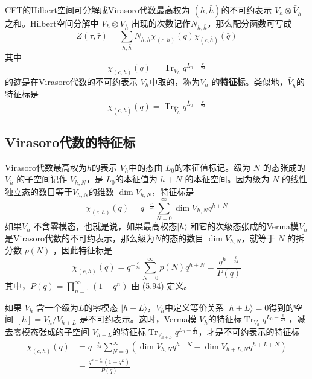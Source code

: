 CFT的Hilbert空间可分解成Virasoro代数最高权为 $(h, \bar{h}) $的不可约表示 $V_{h} \otimes \bar{V}_{\bar{h}} $之和。Hilbert空间分解中 $V_{h} \otimes \bar{V}_{\bar{h}}$ 出现的次数记作$ N_{h, \bar{h}} $，那么配分函数可写成
\begin{equation}
	Z(\tau, \bar{\tau})=\sum_{h, \bar{h}} N_{h, \bar{h}} \chi_{(c, h)}(q) \chi_{(c, \bar{h})}(\bar{q})
\end{equation} 
其中
\begin{equation}
	\chi_{(c, h)}(q)=\operatorname{Tr}_{V_{h}} q^{L_{0}-\frac{c}{24}} 
\end{equation}
的迹是在Virasoro代数的不可约表示 $V_h $中取的，称为$ V_h$ 的\textbf{特征标}。类似地，$ \bar{V}_{\bar{h}} $的特征标是
\begin{equation}
	\chi_{(c, \bar{h})}(\bar{q})=\operatorname{Tr}_{\bar{V}_{\bar{h}}} \bar{q}^{\bar{L}_{0}-\frac{c}{24}} 
\end{equation}

\subsection{Virasoro代数的特征标}

Virasoro代数最高权为$ h $的表示 $V_h $中的态由 $L_0 $的本征值标记。级为 $N$ 的态张成的 $V_h$ 的子空间记作 $V_{h, N} $，是 $L_0 $的本征值为 $h+N$ 的本征空间。因为级为 $N$ 的线性独立态的数目等于$ V_{h, N} $的维数 $\operatorname{dim} V_{h, N} $，特征标是
\begin{equation}
	\chi_{(c, h)}(q)=q^{-\frac{c}{24}} \sum_{N=0}^{\infty} \operatorname{dim} V_{h, N} q^{h+N} 
\end{equation}
如果$ V_h$ 不含零模态，也就是说，如果最高权态$ |h\rangle$ 和它的次级态张成的Verma模$ V_h$ 是Virasoro代数的不可约表示，那么级为$ N $的态的数目 $\operatorname{dim} V_{h, N} $，就等于 $N$ 的拆分数 $p(N)$ ，因此特征标是
\begin{equation}
	\chi_{(c, h)}(q)=q^{-\frac{c}{24}} \sum_{N=0}^{\infty} p(N) q^{h+N}=\frac{q^{h-\frac{c}{24}}}{P(q)}
\end{equation} 
其中，$ P(q)=\prod_{n=1}^{\infty}\left(1-q^{n}\right)$ 由 (5.94) 定义。

如果 $V_h$ 含一个级为$ L $的零模态 $|h+L\rangle $，$ V_h $中定义等价关系 $|h+L\rangle=0 $得到的空间 $[h]=V_{h} / V_{h+L}$ 是不可约表示。这时，Verma模 $V_h $的特征标$ \operatorname{Tr}_{V_{h}} q^{L_{0}-\frac{c}{24}}$ ，减去零模态张成的子空间 $V_{h+L} $的特征标$ \operatorname{Tr}_{V_{h+L}} q^{L_{0}-\frac{c}{24}} $，才是不可约表示的特征标
\begin{equation}
\begin{aligned} \chi_{(c, h)}(q) &=q^{-\frac{c}{24}} \sum_{N=0}^{\infty}\left(\operatorname{dim} V_{h, N} q^{h+N}-\operatorname{dim} V_{h+L, N} q^{h+L+N}\right) \\ &=\frac{q^{h-\frac{c}{24}}\left(1-q^{L}\right)}{P(q)} \end{aligned}
\end{equation}

